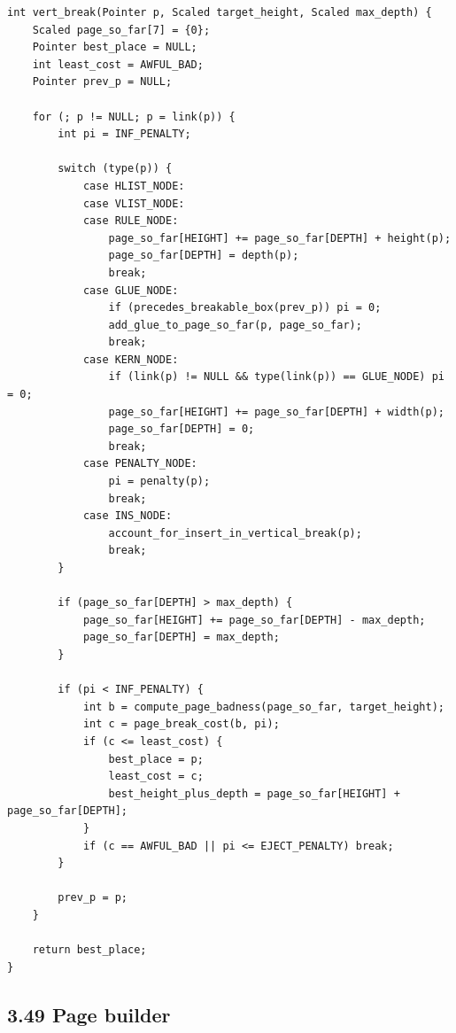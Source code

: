 \documentclass[11pt]{article}
\begin{document}
\begin{verbatim}
int vert_break(Pointer p, Scaled target_height, Scaled max_depth) {
    Scaled page_so_far[7] = {0};
    Pointer best_place = NULL;
    int least_cost = AWFUL_BAD;
    Pointer prev_p = NULL;

    for (; p != NULL; p = link(p)) {
        int pi = INF_PENALTY;

        switch (type(p)) {
            case HLIST_NODE:
            case VLIST_NODE:
            case RULE_NODE:
                page_so_far[HEIGHT] += page_so_far[DEPTH] + height(p);
                page_so_far[DEPTH] = depth(p);
                break;
            case GLUE_NODE:
                if (precedes_breakable_box(prev_p)) pi = 0;
                add_glue_to_page_so_far(p, page_so_far);
                break;
            case KERN_NODE:
                if (link(p) != NULL && type(link(p)) == GLUE_NODE) pi = 0;
                page_so_far[HEIGHT] += page_so_far[DEPTH] + width(p);
                page_so_far[DEPTH] = 0;
                break;
            case PENALTY_NODE:
                pi = penalty(p);
                break;
            case INS_NODE:
                account_for_insert_in_vertical_break(p);
                break;
        }

        if (page_so_far[DEPTH] > max_depth) {
            page_so_far[HEIGHT] += page_so_far[DEPTH] - max_depth;
            page_so_far[DEPTH] = max_depth;
        }

        if (pi < INF_PENALTY) {
            int b = compute_page_badness(page_so_far, target_height);
            int c = page_break_cost(b, pi);
            if (c <= least_cost) {
                best_place = p;
                least_cost = c;
                best_height_plus_depth = page_so_far[HEIGHT] + page_so_far[DEPTH];
            }
            if (c == AWFUL_BAD || pi <= EJECT_PENALTY) break;
        }

        prev_p = p;
    }

    return best_place;
}
\end{verbatim}

\subsection{3.49 Page builder}\label{page-builder}
\end{document}
